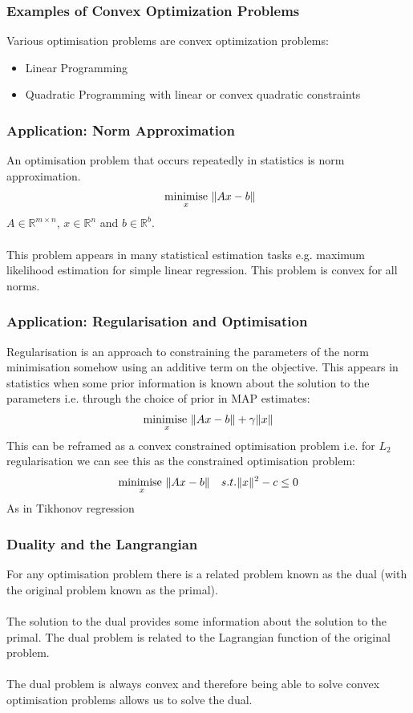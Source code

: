 \documentclass{beamer}
\DeclarePairedDelimiter\norm{\lVert}{\rVert}
\def\rnum{\mathbb{R}}
\begin{document}
\begin{frame}
    \frametitle{Examples of Convex Optimization Problems}
    Various optimisation problems are convex optimization problems:
    \begin{itemize}
        \item Linear Programming
        \item Quadratic Programming with linear or convex quadratic constraints
    \end{itemize}
\end{frame}

\begin{frame}
    \frametitle{Application: Norm Approximation}
    An optimisation problem that occurs repeatedly in statistics is norm
    approximation.
    \begin{align*}
        \underset{x}{\text{ minimise }}\norm{Ax - b}
    \end{align*}
    $A \in \rnum^{m\times n}$, $x \in \rnum^{n}$ and $b \in \rnum^{b}$.
    \\~\\
    This problem appears in many statistical estimation tasks e.g. maximum
    likelihood estimation for simple linear regression. This problem is convex
    for all norms.
\end{frame}


\begin{frame}
    \frametitle{Application: Regularisation and Optimisation}
    Regularisation is an approach to constraining the parameters of the norm
    minimisation somehow using an additive term on the objective. This appears
    in statistics when some prior information is known about the solution to the
    parameters i.e. through the choice of prior in MAP estimates:
    \begin{align*}
        \underset{x}{\text{minimise }} \norm{Ax - b}+ \gamma\norm{x}
    \end{align*}
    This can be reframed as a convex constrained optimisation problem i.e. for
    $L_{2}$ regularisation we can see this as the constrained optimisation
    problem:
    \begin{align*}
        &\underset{x}{\text{minimise }} \norm{Ax - b}
        &s.t. \norm{x}^{2} - c \leq 0
    \end{align*}
    As in Tikhonov regression
\end{frame}

\begin{frame}
    \frametitle{Duality and the Langrangian}
    For any optimisation problem there is a related problem known as the dual
    (with the original problem known as the primal).
    \\~\\
    The solution to the dual provides some information about the solution to the
    primal. The dual problem is related to the Lagrangian function of the
    original problem.
    \\~\\
    The dual problem is always convex and therefore being able to solve
    convex optimisation problems allows us to solve the dual.
\end{frame}
\end{document}

